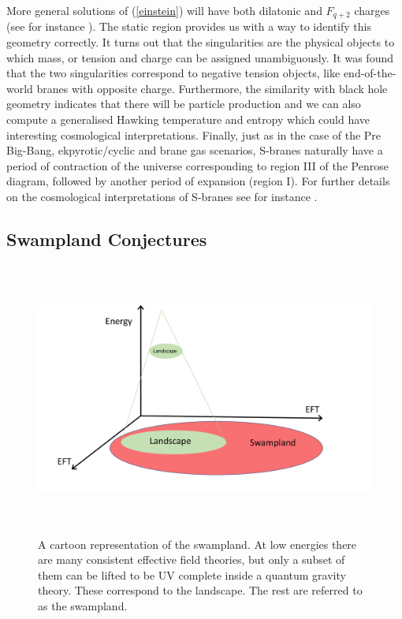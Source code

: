 More general solutions  of (\ref{einstein}) will have both dilatonic  and  $F_{q+2}$ charges (see for instance \cite{Grojean:2001pv,Burgess:2002vu}). 
The static region provides us with a way to  identify 
this geometry correctly. It turns out that the singularities are the
 physical objects  to which mass, or tension and charge can be
 assigned unambiguously.
It was found that the two singularities correspond to negative tension 
objects, like end-of-the-world branes with opposite charge. 
Furthermore, the similarity with black
hole geometry 
indicates that there will be particle production 
 and we 
 can also compute a generalised Hawking temperature and entropy which could have 
interesting cosmological interpretations. Finally, just as in the case of the Pre Big-Bang, ekpyrotic/cyclic and brane gas scenarios, S-branes naturally have a period of contraction of the universe corresponding to region III of the Penrose diagram, followed by another period of expansion (region I). For further details on the cosmological interpretations of S-branes see for instance \cite{Grojean:2001pv,Burgess:2002vu,Cornalba:2002nv,Cornalba:2002fi,Burgess:2003tz,Kounnas:2011gz,Townsend:2003fx,Ohta:2003pu}.




\subsection{Swampland Conjectures}
\label{Sec:Swamp}

\begin{figure}[t]
\begin{center}
\includegraphics[width=140mm,height=90mm]{Sections/Figures/Swampland.pdf} 
\caption{A cartoon representation of the swampland. At low energies there are many consistent effective field theories, but only a subset of them can be lifted to be UV complete inside a quantum gravity theory. These correspond to the landscape. The rest  are referred to as the swampland.} \label{swampland}
\end{center}
\end{figure}

